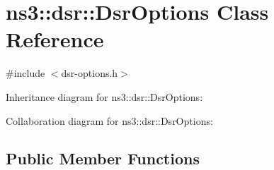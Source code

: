 \hypertarget{classns3_1_1dsr_1_1DsrOptions}{}\section{ns3\+:\+:dsr\+:\+:Dsr\+Options Class Reference}
\label{classns3_1_1dsr_1_1DsrOptions}


{\ttfamily \#include $<$dsr-\/options.\+h$>$}



Inheritance diagram for ns3\+:\+:dsr\+:\+:Dsr\+Options\+:


Collaboration diagram for ns3\+:\+:dsr\+:\+:Dsr\+Options\+:
\subsection*{Public Member Functions}

